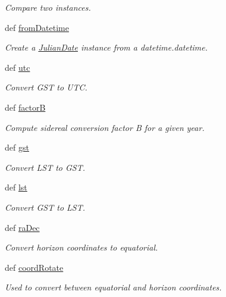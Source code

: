 \begin{DoxyCompactItemize}
\begin{DoxyCompactList}\small\item\em Compare two instances. \end{DoxyCompactList}\item 
def \hyperlink{namespaceamonpy_1_1sim_1_1sidereal__m_aefc163841e5594f50fe38a45c9f8f755}{from\-Datetime}
\begin{DoxyCompactList}\small\item\em Create a \hyperlink{classamonpy_1_1sim_1_1sidereal__m_1_1_julian_date}{Julian\-Date} instance from a datetime.\-datetime. \end{DoxyCompactList}\item 
def \hyperlink{namespaceamonpy_1_1sim_1_1sidereal__m_a623840f9dd19b8dd403049fde317dfcd}{utc}
\begin{DoxyCompactList}\small\item\em Convert G\-S\-T to U\-T\-C. \end{DoxyCompactList}\item 
def \hyperlink{namespaceamonpy_1_1sim_1_1sidereal__m_a97271bc0c1ffe40636c1193fae9a5779}{factor\-B}
\begin{DoxyCompactList}\small\item\em Compute sidereal conversion factor B for a given year. \end{DoxyCompactList}\item 
def \hyperlink{namespaceamonpy_1_1sim_1_1sidereal__m_a3ceb4715702e9eccbe438937f64841e5}{gst}
\begin{DoxyCompactList}\small\item\em Convert L\-S\-T to G\-S\-T. \end{DoxyCompactList}\item 
def \hyperlink{namespaceamonpy_1_1sim_1_1sidereal__m_aadd58889c748745ded05af6b92b7f665}{lst}
\begin{DoxyCompactList}\small\item\em Convert G\-S\-T to L\-S\-T. \end{DoxyCompactList}\item 
def \hyperlink{namespaceamonpy_1_1sim_1_1sidereal__m_a053e2d463d8b8606c7038c96b8e32f5d}{ra\-Dec}
\begin{DoxyCompactList}\small\item\em Convert horizon coordinates to equatorial. \end{DoxyCompactList}\item 
def \hyperlink{namespaceamonpy_1_1sim_1_1sidereal__m_ac2845b35cea229ad8f15873f7a866334}{coord\-Rotate}
\begin{DoxyCompactList}\small\item\em Used to convert between equatorial and horizon coordinates. \end{DoxyCompactList}\item 

\end{DoxyCompactItemize}
